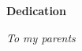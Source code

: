 

\begin{center}

\vspace*{5\baselineskip}
\textbf{\large Dedication}
\end{center}


\begin{flushleft}
\hspace{10mm}\textit{To my parents}
\end{flushleft}





